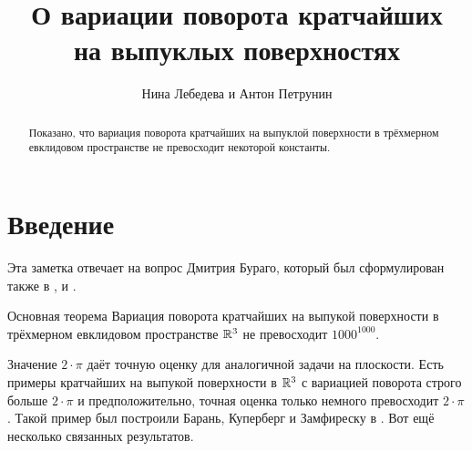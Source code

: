 \documentclass[a4paper,10pt]{article}
\begin{document}
\title{О вариации поворота кратчайших\\
 на выпуклых поверхностях}
\author{Нина Лебедева и Антон Петрунин}



\date{}
\maketitle

\begin{abstract}
Показано, что вариация поворота кратчайших
на выпуклой поверхности в трёхмерном евклидовом пространстве 
не превосходит некоторой константы.
\end{abstract}


\section{Введение}


Эта заметка отвечает на вопрос Дмитрия Бураго,
который был сформулирован также в \cite{AH-PSV}, \cite{pach} и \cite{BKZ}. 

\begin{thm}{Основная теорема}\label{thm:main}
Вариация поворота кратчайших
на выпукой поверхности в трёхмерном евклидовом пространстве $\mathbb{R}^3$ 
не превосходит $1000^{1000}$.
\end{thm}

Значение $2\cdot\pi$ даёт точную оценку для аналогичной задачи на плоскости.
Есть примеры кратчайших на выпукой поверхности в $\mathbb{R}^3$
с вариацией поворота строго больше $2\cdot\pi$ и
предположительно, точная оценка только немного превосходит $2\cdot\pi$.
Такой пример был построили Барань, Куперберг и Замфиреску в \cite{BKZ}. 
Вот ещё несколько связанных результатов.
\end{document}

